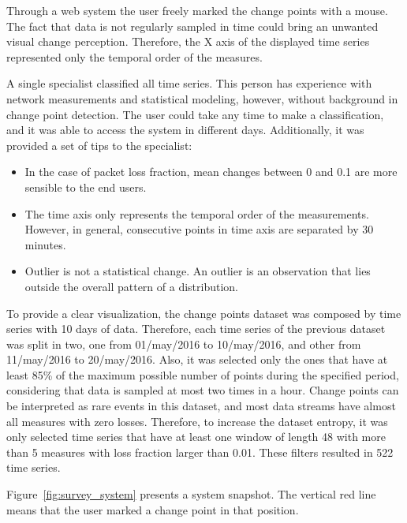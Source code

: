 Through a web system the user freely marked the change points with a mouse. The fact that data is not regularly sampled in time could bring an unwanted visual change perception. Therefore, the X axis of the displayed time series represented only the temporal order of the measures.

A single specialist classified all time series. This person has experience with network measurements and statistical modeling, however, without background in change point detection. The user could take any time to make a classification, and it was able to access the system in different days. Additionally, it was provided a set of tips to the specialist:

\begin{itemize}
    \item In the case of packet loss fraction, mean changes between 0 and 0.1 are more sensible to the end users.
    \item The time axis only represents the temporal order of the measurements. However, in general, consecutive points in time axis are separated by 30 minutes.
    \item Outlier is not a statistical change. An outlier is an observation that lies outside the overall pattern of a distribution.
\end{itemize}

To provide a clear visualization, the change points dataset was composed by time series with 10 days of data. Therefore, each time series of the previous dataset was split in two, one from 01/may/2016 to 10/may/2016, and other from 11/may/2016 to 20/may/2016. Also, it was selected only the ones that have at least 85\% of the maximum possible number of points during the specified period, considering that data is sampled at most two times in a hour. Change points can be interpreted as rare events in this dataset, and most data streams have almost all measures with zero losses. Therefore, to increase the dataset entropy, it was only selected time series that have at least one window of length 48 with more than 5 measures with loss fraction larger than 0.01. These filters resulted in 522 time series.

Figure~\ref{fig:survey_system} presents a system snapshot. The vertical red line means that the user marked a change point in that position.

